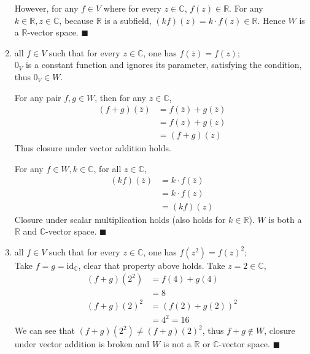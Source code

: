 \documentclass{article}
\theoremstyle{definition}
\numberwithin{equation}{problem}
\newcommand{\R}{\mathbb{R}}
\newcommand{\C}{\mathbb{C}}
\renewcommand{\vec}[1]{\mathit{#1}_V}
\newcommand{\conj}[1]{\overline{#1}}
\begin{document}
\begin{enumerate}[label=(\roman*)]
        However, for any $f\in V$ where for every $z\in \C$, $f(z) \in \R$. For any $k\in \R, z\in \C$,
        because $\R$ is a subfield, $(kf)(z) = k\cdot f(z) \in \R$. Hence $W$ is a $\R$-vector space.
        \hfill$\blacksquare$
    \item all $f\in V$ such that for every $z\in \C$, one has $f(\conj{z}) = f(z)$;\\
        $\vec{0}$ is a constant function and ignores its parameter, satisfying the condition, thus $\vec{0} \in W$.

        For any pair $f,g \in W$, then for any $z\in \C$,
        \begin{align*}
            (f+g)(\conj{z}) &= f(\conj{z}) + g(\conj{z}) \\
            &= f(z) + g(z) \\
            &= (f+g)(z)
        \end{align*}
        Thus closure under vector addition holds.

        For any $f \in W, k\in \C$, for all $z\in \C$,
        \begin{align*}
            (kf)(\conj{z}) &= k\cdot f(\conj{z})    \\
            &= k\cdot f(z)  \\
            &= (kf)(z)
        \end{align*}
        Closure under scalar multiplication holds (also holds for $k\in \R$).
        $W$ is both a $\R$ and $\C$-vector space.
        \hfill$\blacksquare$
    \item all $f\in V$ such that for every $z\in \C$, one has $f(z^2) = f(z)^2$;\\
        Take $f = g = \text{id}_\C$, clear that property above holds.
        Take $z = 2 \in \C$,
        \begin{align*}
            (f+g)(2^2) &= f(4) + g(4)   \\
            &= 8    \\
            (f+g)(2)^2 &= (f(2) + g(2))^2   \\
            &= 4^2 = 16
        \end{align*}
        We can see that $(f+g)(2^2) \ne (f+g)(2)^2$,
        thus $f + g \notin W$,
        closure under vector addition is broken and $W$ is not a $\R$ or $\C$-vector space.
        \hfill$\blacksquare$
\end{enumerate}
\end{document}
